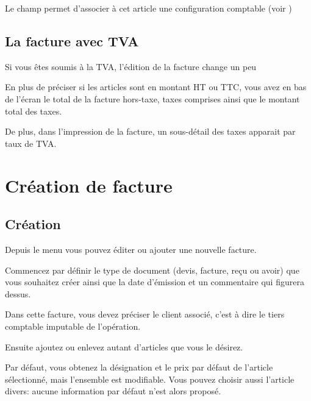 \documentclass[a4paper,10pt,oneside,french]{sphinxmanual}
\begin{document}
Le champ  permet d’associer à cet article une configuration comptable (voir )


\subsection{La facture avec TVA}
\label{\detokenize{invoice/articles:la-facture-avec-tva}}
Si vous êtes soumis à la TVA, l’édition de la facture change un peu

En plus de préciser si les articles sont en montant HT ou TTC, vous avez en bas de l’écran le total de la facture hors-taxe, taxes comprises ainsi que le montant total des taxes.

De plus, dans l’impression de la facture, un sous-détail des taxes apparait par taux de TVA.


\section{Création de facture}
\label{\detokenize{invoice/create_bill::doc}}\label{\detokenize{invoice/create_bill:creation-de-facture}}

\subsection{Création}
\label{\detokenize{invoice/create_bill:creation}}
Depuis le menu  vous pouvez éditer ou ajouter une nouvelle facture.

Commencez par définir le type de document (devis, facture, reçu ou avoir) que vous souhaitez créer ainsi que la date d’émission et un commentaire qui figurera dessus.

Dans cette facture, vous devez préciser le client associé, c’est à dire le tiers comptable imputable de l’opération.
\begin{quote}

\noindent{}
\end{quote}

Ensuite ajoutez ou enlevez autant d’articles que vous le désirez.
\begin{quote}

\noindent{}
\end{quote}

Par défaut, vous obtenez la désignation et le prix par défaut de l’article sélectionné, mais l’ensemble est modifiable. Vous pouvez choisir aussi l’article divers: aucune information par défaut n’est alors proposé.
\end{document}

